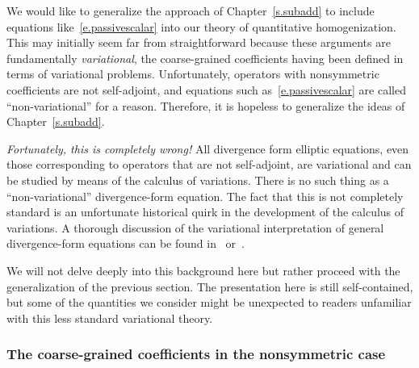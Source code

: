 \documentclass[11pt,twoside]{article} %
\numberwithin{equation}{section}
\theoremstyle{definition}
\begin{document}
\smallskip

We would like to generalize the approach of Chapter~\ref{s.subadd}
to include equations like~\eqref{e.passivescalar} into our theory of quantitative homogenization. This may initially seem far from straightforward because these arguments are fundamentally \emph{variational}, the coarse-grained coefficients having been defined in terms of variational problems. Unfortunately, operators with nonsymmetric coefficients are not self-adjoint, and equations such as~\eqref{e.passivescalar} are called ``non-variational'' for a reason. 
Therefore, it is hopeless to generalize the ideas of Chapter~\ref{s.subadd}.

\smallskip

\emph{Fortunately, this is completely wrong!} All divergence form elliptic equations, even those corresponding to operators that are not self-adjoint, are variational and can be studied by means of the calculus of variations. There is no such thing as a ``non-variational'' divergence-form equation. The fact that this is not completely standard is an unfortunate historical quirk in the development of the calculus of variations. 
A thorough discussion of the variational interpretation of general divergence-form equations can be found in~\cite[Section 10.1]{AKMBook} or~\cite{AM}. 

\smallskip

We will not delve deeply into this background here but rather proceed with the generalization of the previous section. The presentation here is still self-contained, but some of the quantities we consider might be unexpected to readers unfamiliar with this less standard variational theory. 

\subsubsection{The coarse-grained coefficients in the nonsymmetric case}
\label{ss.subadd.doubletrouble.new}
\end{document}
